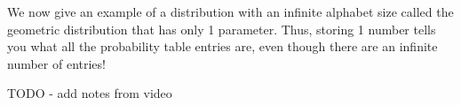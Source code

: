\documentclass[6008notes.tex]{subfiles}
\begin{document}
We now give an example of a distribution with an infinite alphabet size called the geometric distribution that has only 1 parameter. Thus, storing 1 number tells you what all the probability table entries are, even though there are an infinite number of entries!

TODO - add notes from video

\end{document}
